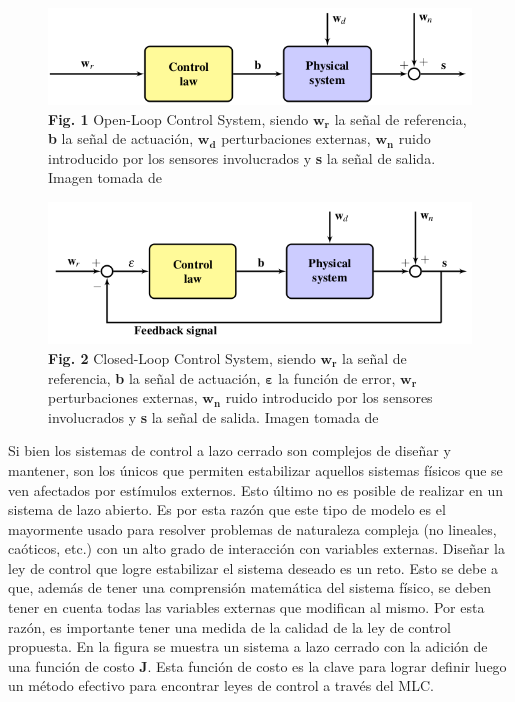 \documentclass[a4paper,10pt]{article}
\begin{document}
        \begin{figure}[!Hhtb]
            \centering
            \includegraphics[width=12cm,origin=c]{Imagenes/open_loop.png}
            \caption{\textbf{Fig. 1} Open-Loop Control System, siendo $\mathbf{w_r}$ la señal de referencia, \textbf{b} la señal de
            actuación, $\mathbf{w_d}$ perturbaciones externas, $\mathbf{w_n}$ ruido introducido por los sensores involucrados y
            \textbf{s} la señal de salida. Imagen tomada de \cite{Duriez2016}} \label{fig001}
        \end{figure}

        \begin{figure}[!Hhtb]
            \centering
            \includegraphics[width=12cm,origin=c]{Imagenes/closed_loop.png}
            \caption{\textbf{Fig. 2} Closed-Loop Control System, siendo $\mathbf{w_r}$ la señal de referencia, \textbf{b} la señal
            de actuación, $\bm{\varepsilon}$ la función de error, $\mathbf{w_r}$ perturbaciones externas, $\mathbf{w_n}$ ruido introducido 
            por los sensores involucrados y \textbf{s} la señal de salida. Imagen tomada de \cite{Duriez2016}} \label{fig002}
        \end{figure}

        Si bien los sistemas de control a lazo cerrado son complejos de diseñar y mantener, son los únicos que permiten estabilizar
        aquellos sistemas físicos que se ven afectados por estímulos externos. Esto último no es posible de realizar en un sistema de
        lazo abierto. Es por esta razón que este tipo de modelo es el mayormente usado para resolver problemas de naturaleza compleja
        (no lineales, caóticos, etc.) con un alto grado de interacción con variables externas.
        \indent Diseñar la ley de control que logre estabilizar el sistema deseado es un reto. Esto se debe a que, además de tener una
        comprensión matemática del sistema físico, se deben tener en cuenta todas las variables externas que modifican al mismo. Por esta
        razón, es importante tener una medida de la calidad de la ley de control propuesta. En la figura \label{fig003} se muestra un
        sistema a lazo cerrado con la adición de una función de costo \textbf{J}. Esta función de costo es la clave para lograr definir
        luego un método efectivo para encontrar leyes de control a través del MLC.
\end{document}
